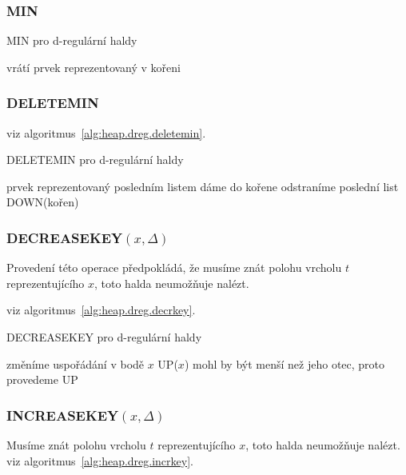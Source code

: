 \subsubsection{MIN}

\begin{algorithm}[!htb]
\caption{MIN pro d-regulární haldy}
\label{alg:heap.dreg.min}
\begin{algorithmic}
\STATE vrátí prvek reprezentovaný v kořeni
\end{algorithmic}
\end{algorithm}

\subsubsection{DELETEMIN}

viz algoritmus~\ref{alg:heap.dreg.deletemin}.

\begin{algorithm}[!htb]
\caption{DELETEMIN pro d-regulární haldy}
\label{alg:heap.dreg.deletemin}
\begin{algorithmic}
\STATE prvek reprezentovaný posledním listem dáme do kořene
\STATE odstraníme poslední list 
\STATE DOWN(kořen)
\end{algorithmic}
\end{algorithm}

\subsubsection{DECREASEKEY$(x, \Delta)$}

Provedení této operace předpokládá, že musíme znát polohu vrcholu $t$
reprezentujícího $x$, toto halda neumožňuje nalézt. 

viz algoritmus~\ref{alg:heap.dreg.decrkey}.

\begin{algorithm}[!htb]
\caption{DECREASEKEY pro d-regulární haldy}
\label{alg:heap.dreg.decrkey}
\begin{algorithmic}
\STATE změníme uspořádání v bodě $x$ 
\STATE UP($x$) mohl by být menší než jeho otec, proto provedeme UP 
\end{algorithmic}
\end{algorithm}

\subsubsection{INCREASEKEY$(x, \Delta)$}

Musíme znát polohu vrcholu $t$ reprezentujícího $x$, 
toto halda neumožňuje nalézt. 
viz algoritmus~\ref{alg:heap.dreg.incrkey}.

